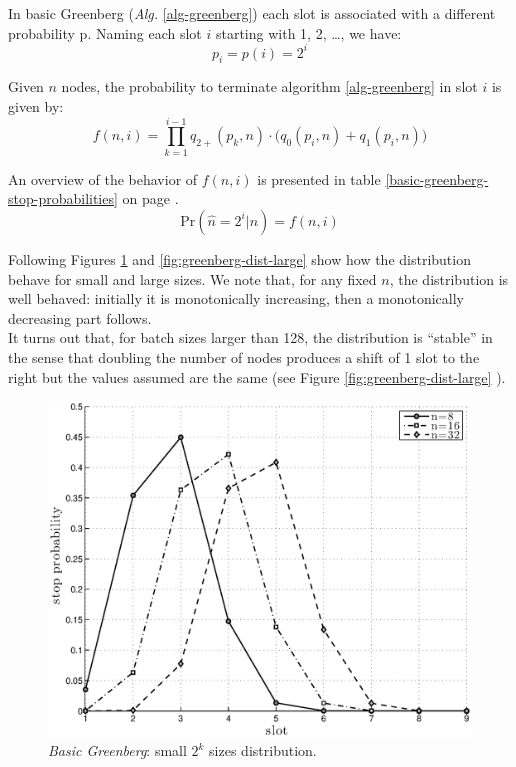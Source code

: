 \documentclass[12pt,a4paper]{report}
\begin{document}
In basic Greenberg (\emph{Alg.} \ref{alg-greenberg}) each slot is associated with a different probability p. Naming each slot $i$ starting with 1, 2, \dots, we have:
\begin{equation}
	p_{i}=p(i)=2^{i}
\end{equation}

Given $n$ nodes, the probability to terminate algorithm \ref{alg-greenberg} in slot $i$ is given by:
\begin{equation}
f(n,i)=\prod_{k=1}^{i-1}q_{2+}(p_{k},n) \cdot \bigl( q_{0}(p_{i},n)+q_{1}(p_{i},n)\bigr)  
\label{eq:bgstopprobability}
\end{equation}

An overview of the behavior of $f(n,i)$ is presented in table \ref{basic-greenberg-stop-probabilities} on page \pageref{basic-greenberg-stop-probabilities}.\\
\begin{equation}
\textrm{Pr}\left( \hat{n}=2^{i}|n\right)=f(n,i)  
\end{equation}

Following Figures \ref{fig:greenberg-dist-small} and \ref{fig:greenberg-dist-large} show how the distribution behave for small and large sizes.
We note that, for any fixed $n$, the distribution is well behaved: initially it is monotonically increasing, then a monotonically decreasing part follows.\\
It turns out that, for batch sizes larger than 128, the distribution is ``stable'' in the sense that doubling the number of nodes produces a shift of 1 slot to the right but the values assumed are the same (see Figure \ref{fig:greenberg-dist-large} ).\\


\begin{figure}[htbp]
\begin{center}
\includegraphics[scale=0.7]{matlab/Greenberg_stop_prob/greenberg-stop-distribution-uniformity-init}
\caption{\emph{Basic Greenberg}:  small $2^{k}$ sizes distribution.}
\label{fig:greenberg-dist-small}
\end{center}
\end{figure}
\end{document}
